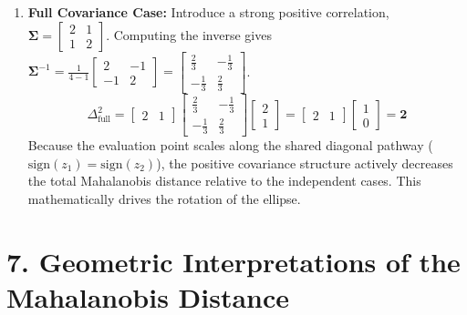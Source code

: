 \documentclass{article}
\begin{document}
\begin{enumerate}
    \item \textbf{Full Covariance Case:} Introduce a strong positive correlation, $\boldsymbol{\Sigma} = \begin{bmatrix} 2 & 1 \\ 1 & 2 \end{bmatrix}$. 
    Computing the inverse gives $\boldsymbol{\Sigma}^{-1} = \frac{1}{4 - 1}\begin{bmatrix} 2 & -1 \\ -1 & 2 \end{bmatrix} = \begin{bmatrix} \frac{2}{3} & -\frac{1}{3} \\ -\frac{1}{3} & \frac{2}{3} \end{bmatrix}$.
    \begin{equation*}
    \Delta^2_{\text{full}} = \begin{bmatrix} 2 & 1 \end{bmatrix} \begin{bmatrix} \frac{2}{3} & -\frac{1}{3} \\ -\frac{1}{3} & \frac{2}{3} \end{bmatrix} \begin{bmatrix} 2 \\ 1 \end{bmatrix} = \begin{bmatrix} 2 & 1 \end{bmatrix} \begin{bmatrix} 1 \\ 0 \end{bmatrix} = \mathbf{2}
    \end{equation*}
    Because the evaluation point scales along the shared diagonal pathway ($\text{sign}(z_1) = \text{sign}(z_2)$), the positive covariance structure actively decreases the total Mahalanobis distance relative to the independent cases. This mathematically drives the rotation of the ellipse.
\end{enumerate}

\section*{7. Geometric Interpretations of the Mahalanobis Distance}
\end{document}
